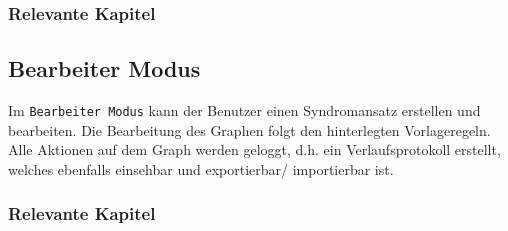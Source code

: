 \documentclass[enabledeprecatedfontcommands,fontsize=11pt,paper=a4,twoside]{scrartcl}
\newcounter{one}
\newcounter{two}[one]
\let\tempone\itemize
\let\temptwo\enditemize
\renewenvironment{itemize}{\tempone\addtolength{\itemsep}{-10.0pt}}{\temptwo}
\begin{document}
\subsubsection{Relevante Kapitel}
\begin{itemize}
	\item {}
	\item {}
	\item {}	
	\item {}	
	\item {}	
	\item {}
	\item {}
	\item {}
	\item {}
	\item {}
	\item {}
	\item {}
	\item {}
	\item {}	
\end{itemize}
\subsection{Bearbeiter Modus} \label{sec:editor}
Im \texttt{Bearbeiter Modus} kann der Benutzer einen Syndromansatz erstellen und bearbeiten. Die Bearbeitung des Graphen folgt den hinterlegten Vorlageregeln. Alle Aktionen auf dem Graph werden geloggt, d.h. ein Verlaufsprotokoll erstellt, welches ebenfalls einsehbar und exportierbar/ importierbar ist. 
\subsubsection{Relevante Kapitel}
\begin{itemize}
	\item {}
	\item {}
	\item {}	
	\item {}	
	\item {}	
	\item {}
	\item {}
	\item {}
	\item {}
	\item {}
	\item {}
	\item {}
	\item {}
	\item {}	
\end{itemize}
\end{document}
